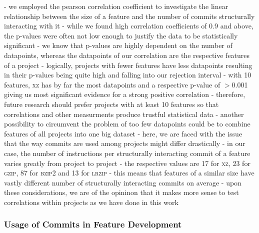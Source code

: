 - we employed the pearson correlation coefficient to investigate the linear relationship between the size of a feature and the number of commits structurally interacting with it
- while we found high correlation coefficients of 0.9 and above, the p-values were often not low enough to justify the data to be statistically significant 
- we know that p-values are highly dependent on the number of datapoints, whereas the datapoints of our correlation are the respective features of a project
- logically, projects with fewer features have less datapoints resulting in their p-values being quite high and falling into our rejection interval
- with 10 features, \textsc{xz} has by far the most datapoints and a respective p-value of $>$0.001 giving us most significant evidence for a strong positive correlation 
- therefore, future research should prefer projects with at least 10 features so that correlations and other measurments produce trustful statistical data 
- another possibility to circumvent the problem of too few datapoints could be to combine features of all projects into one big dataset
- here, we are faced with the issue that the way commits are used among projects might differ drastically 
- in our case, the number of instructions per structurally interacting commit of a feature varies greatly from project to project
- the respective values are 17 for \textsc{xz}, 23 for \textsc{gzip}, 87 for \textsc{bzip2} and 13 for \textsc{lrzip}
- this means that features of a similar size have vastly different number of structurally interacting commits on average
- upon these considerations, we are of the opininon that it makes more sense to test correlations within projects as we have done in this work

\subsubsection*{Usage of Commits in Feature Development}\label{sec:eval_commit_usage}

